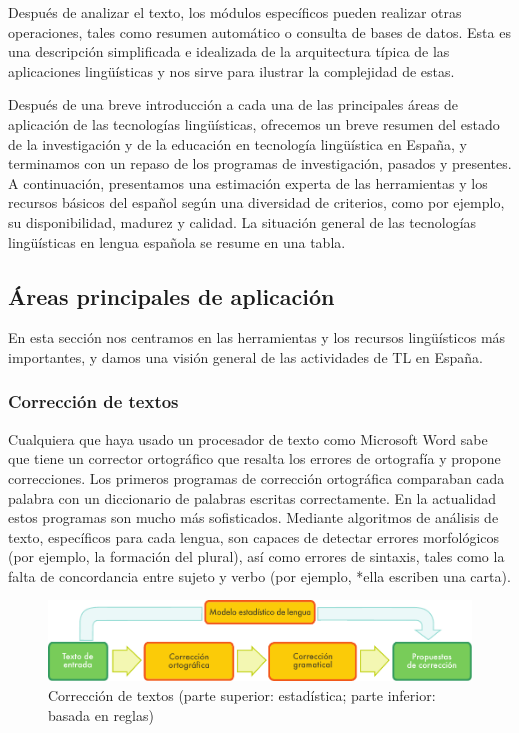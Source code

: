 \begin{multicols}{2}
Después de analizar el texto, los módulos específicos pueden realizar otras operaciones, tales como resumen automático o consulta de bases de datos. Esta es una descripción simplificada e idealizada de la arquitectura típica de las aplicaciones lingüísticas y nos sirve para ilustrar la complejidad de estas.

Después de una breve introducción a cada una de las principales áreas de aplicación de las tecnologías lingüísticas, ofrecemos un breve resumen del estado de la investigación y de la educación en tecnología lingüística en España, y terminamos con un repaso de los programas de investigación, pasados y presentes. A continuación, presentamos una estimación experta de las herramientas y los recursos básicos del español según una diversidad de criterios, como por ejemplo, su disponibilidad, madurez y calidad. La situación general de las tecnologías lingüísticas en lengua española se resume en una tabla.

\subsection{Áreas principales de aplicación} 

En esta sección nos centramos en las herramientas y los recursos lingüísticos más importantes, y damos una visión general de las actividades de TL en España. 

\subsubsection{Corrección de textos}

Cualquiera que haya usado un procesador de texto como Microsoft Word sabe que tiene un corrector ortográfico que resalta los errores de ortografía y propone correcciones. Los primeros programas de corrección ortográfica comparaban cada palabra con un diccionario de palabras escritas correctamente. En la actualidad estos programas son mucho más sofisticados. Mediante algoritmos de análisis de texto, específicos para cada lengua, son capaces de detectar errores morfológicos (por ejemplo, la formación del plural), así como errores de sintaxis, tales como la falta de concordancia entre sujeto y verbo (por ejemplo, *ella escriben una carta). 

\begin{figure}[htb]

  \bigskip
  \centering
  \includegraphics[width=\textwidth]{../_media/spanish/language_checking}
  \caption{Corrección de textos (parte superior: estadística; parte inferior: basada en reglas)}
  \label{fig:langcheckingaarch_de}
\end{figure}


\end{multicols}
